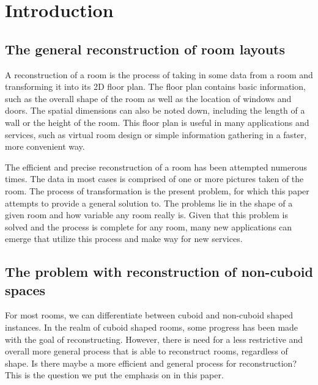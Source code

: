 \section{Introduction}

\subsection{The general reconstruction of room layouts} %
A reconstruction of a room is the process of taking in some data from a room and transforming it into its 2D floor plan. The floor plan contains basic information, such as the overall shape of the room as well as the location of windows and doors. The spatial dimensions can also be noted down, including the length of a wall or the height of the room. This floor plan is useful in many applications and services, such as virtual room design or simple information gathering in a faster, more convenient way. 

The efficient and precise reconstruction of a room has been attempted numerous
times. The data in most cases is comprised of one or more pictures taken of the room. The process of transformation is the present problem, for which this paper attempts to provide a general solution to. The problems lie in the shape of a given room and how variable any room really is. Given that this problem is solved and the process is complete for any room, many new applications can emerge that utilize this process and make way for new services.


\subsection{The problem with reconstruction of non-cuboid spaces} %
For most rooms, we can differentiate between cuboid and non-cuboid shaped instances. In the realm of cuboid shaped rooms, some progress has been made with the goal of reconstructing. However, there is need for a less restrictive and overall more general process that is able to reconstruct rooms, regardless of shape. Is there maybe a more efficient and general process for reconstruction? This is the question we put the emphasis on in this paper.

